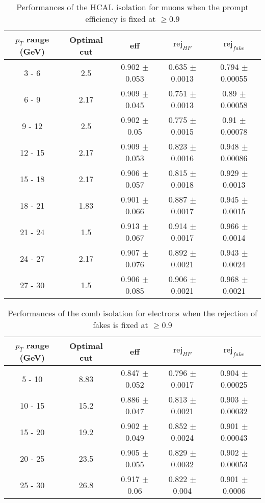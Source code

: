 \begin{table}[htbp]
   \centering
   \begin{tabular}{|c|c|c|c|c|}
      \hline
      $p_T$ range (GeV) & Optimal cut & eff & $\textrm{rej}_{HF}$ & $\textrm{rej}_{fake}$ \\
      \hline
      3 - 6 & 2.5 & 0.902 $\pm$ 0.053 & 0.635 $\pm$ 0.0013 & 0.794 $\pm$ 0.00055 \\
      \hline
      6 - 9 & 2.17 & 0.909 $\pm$ 0.045 & 0.751 $\pm$ 0.0013 & 0.89 $\pm$ 0.00058 \\
      \hline
      9 - 12 & 2.5 & 0.902 $\pm$ 0.05 & 0.775 $\pm$ 0.0015 & 0.91 $\pm$ 0.00078 \\
      \hline
      12 - 15 & 2.17 & 0.909 $\pm$ 0.053 & 0.823 $\pm$ 0.0016 & 0.948 $\pm$ 0.00086 \\
      \hline
      15 - 18 & 2.17 & 0.906 $\pm$ 0.057 & 0.815 $\pm$ 0.0018 & 0.929 $\pm$ 0.0013 \\
      \hline
      18 - 21 & 1.83 & 0.901 $\pm$ 0.066 & 0.887 $\pm$ 0.0017 & 0.945 $\pm$ 0.0015 \\
      \hline
      21 - 24 & 1.5 & 0.913 $\pm$ 0.067 & 0.914 $\pm$ 0.0017 & 0.966 $\pm$ 0.0014 \\
      \hline
      24 - 27 & 2.17 & 0.907 $\pm$ 0.076 & 0.892 $\pm$ 0.0021 & 0.943 $\pm$ 0.0024 \\
      \hline
      27 - 30 & 1.5 & 0.906 $\pm$ 0.085 & 0.906 $\pm$ 0.0021 & 0.968 $\pm$ 0.0021 \\
      \hline
   \end{tabular}
   \caption{\small{Performances of the HCAL isolation for muons when the prompt efficiency is fixed at $\geq 0.9$}\label{tab:hcal_muon_eff}}
\end{table}






\begin{table}[htbp]
   \centering
   \begin{tabular}{|c|c|c|c|c|}
      \hline
      $p_T$ range (GeV) & Optimal cut & eff & $\textrm{rej}_{HF}$ & $\textrm{rej}_{fake}$ \\
      \hline
      5 - 10 & 8.83 & 0.847 $\pm$ 0.052 & 0.796 $\pm$ 0.0017 & 0.904 $\pm$ 0.00025 \\
      \hline
      10 - 15 & 15.2 & 0.886 $\pm$ 0.047 & 0.813 $\pm$ 0.0021 & 0.903 $\pm$ 0.00032 \\
      \hline
      15 - 20 & 19.2 & 0.902 $\pm$ 0.049 & 0.852 $\pm$ 0.0024 & 0.901 $\pm$ 0.00043 \\
      \hline
      20 - 25 & 23.5 & 0.905 $\pm$ 0.055 & 0.829 $\pm$ 0.0032 & 0.902 $\pm$ 0.00053 \\
      \hline
      25 - 30 & 26.8 & 0.917 $\pm$ 0.06 & 0.822 $\pm$ 0.004 & 0.901 $\pm$ 0.0006 \\
      \hline
   \end{tabular}
   \caption{\small{Performances of the comb isolation for electrons when the rejection of fakes is fixed at $\geq 0.9$}\label{tab:comb_elec_pureFake}}
\end{table}






